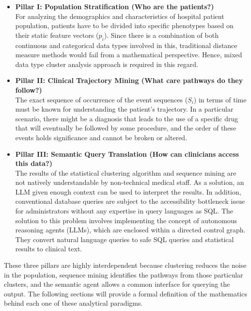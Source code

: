 \begin{itemize}
    \item \textbf{Pillar I: Population Stratification (Who are the patients?)} \\
    For analyzing the demographics and characteristics of hospital patient population, patients have to be divided into specific phenotypes based on their static feature vectors ($p_i$). Since there is a combination of both continuous and categorical data types involved in this, traditional distance measure methods would fail from a mathematical perspective. Hence, mixed data type cluster analysis approach is required in this regard.

    \vspace{0.5em}

    \item \textbf{Pillar II: Clinical Trajectory Mining (What care pathways do they follow?)} \\
    The exact sequence of occurrence of the event sequences ($S_i$) in terms of time must be known for understanding the patient's trajectory. In a particular scenario, there might be a diagnosis that leads to the use of a specific drug that will eventually be followed by some procedure, and the order of these events holds significance and cannot be broken or altered.

    \vspace{0.5em}

    \item \textbf{Pillar III: Semantic Query Translation (How can clinicians access this data?)} \\
    The results of the statistical clustering algorithm and sequence mining are not natively understandable by non-technical medical staff. As a solution, an LLM given enough context can be used to interpret the results. In addition, conventional database queries are subject to the accessibility bottleneck issue for administrators without any expertise in query languages as SQL. The solution to this problem involves implementing the concept of autonomous reasoning agents (LLMs), which are enclosed within a directed control graph. They convert natural language queries to safe SQL queries and statistical results to clinical text.
\end{itemize}

\vspace{1em}

These three pillars are highly interdependent because clustering reduces the noise in the population, sequence mining identifies the pathways from those particular clusters, and the semantic agent allows a common interface for querying the output. The following sections will provide a formal definition of the mathematics behind each one of these analytical paradigms.
